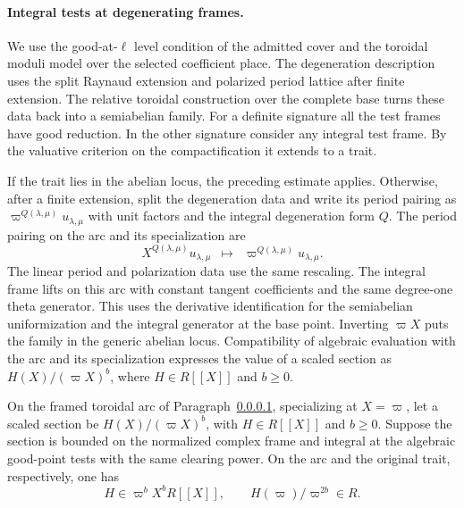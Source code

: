 \paragraph{Integral tests at degenerating frames.}\label{par:theta-degenerate-arc}
We use the good-at-\(\ell\) level condition of the
admitted cover and the toroidal moduli model over the
selected coefficient place. The degeneration description
uses the split Raynaud extension and polarized period
lattice after finite extension. The relative toroidal
construction over the complete base turns these data
back into a semiabelian family. \cite{faltings-chai}
For a definite signature
all the test frames have good reduction. In the other
signature consider any integral test frame. By the
valuative criterion on the compactification it extends
to a trait.

If the trait lies in the abelian locus, the
preceding estimate applies. Otherwise, after a finite
extension, split the degeneration data and write its
period pairing as
\(\varpi^{Q(\lambda,\mu)}u_{\lambda,\mu}\) with
unit factors and the integral degeneration form \(Q\).
The period pairing on the arc and its specialization are
\[
 X^{Q(\lambda,\mu)}u_{\lambda,\mu}\ \;\longmapsto\;\ \varpi^{Q(\lambda,\mu)}u_{\lambda,\mu}.
\]
The linear
period and polarization data use the same rescaling.
The integral frame lifts on this arc with constant
tangent coefficients and the same degree-one
theta generator. This uses the derivative
identification for the semiabelian uniformization
and the integral generator at the base point.
Inverting \(\varpi X\) puts the family in the
generic abelian locus. Compatibility of algebraic
evaluation with the arc and its specialization
expresses the value of a scaled section as
\(H(X)/(\varpi X)^b\), where \(H\in R[[X]]\)
and \(b\ge0\).

\begin{lemma}\label{lem:theta-arc-integrality}
On the framed toroidal arc of Paragraph~\ref{par:theta-degenerate-arc},
specializing at \(X=\varpi\), let a scaled section be
\(H(X)/(\varpi X)^b\), with \(H\in R[[X]]\) and \(b\ge0\).
Suppose the section is bounded on the normalized complex frame
and integral at the algebraic good-point tests with the same
clearing power. On the arc and the original trait, respectively, one has
\[
 H\in \varpi^b X^b R[[X]],\qquad H(\varpi)/\varpi^{2b}\in R.
\]
\end{lemma}

